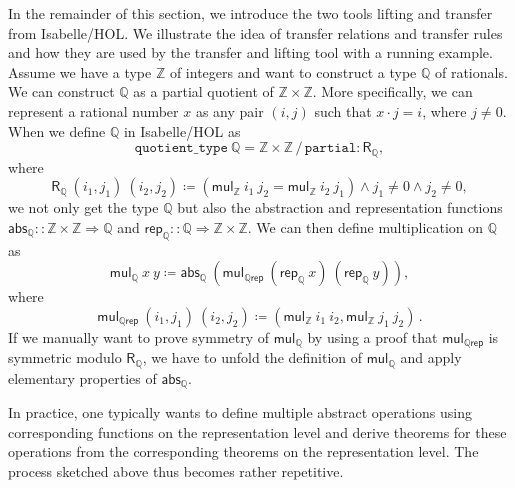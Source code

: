 \documentclass{article}
\theoremstyle{definition}
\newcommand{\inte}{\mathbb{Z}}
\newcommand{\rat}{\mathbb{Q}}
\newcommand{\abs}{\mathsf{abs}}
\newcommand{\rep}{\mathsf{rep}}
\begin{document}
In the remainder of this section,
we introduce the two tools lifting and transfer from Isabelle/HOL.
We illustrate the idea of transfer relations and transfer rules
and how they are used by the transfer and lifting tool with a running example.
Assume we have a type \(\inte\) of integers and want to construct a type \(\rat\) of rationals.
We can construct \(\rat\) as a partial quotient of \(\inte \times \inte\).
More specifically, we can represent a rational number \(x\) as any pair \((i, j)\)
such that \(x \cdot j = i\),
where \(j \neq 0\).
When we define \(\rat\) in Isabelle/HOL as
\begin{equation*}
	\mathtt{quotient\_type}\ \rat = \inte \times \inte\, /\, \mathtt{partial} : \mathsf{R}_{\rat},
\end{equation*}
where
\begin{equation*}
	\mathsf{R}_\rat\ (i_1, j_1)\ (i_2, j_2) \coloneqq (\mathsf{mul_\inte}\ i_1\ j_2 = \mathsf{mul_\inte}\ i_2\ j_1) \land j_1 \neq 0 \land j_2 \neq 0,
\end{equation*}
we not only get the type \(\rat\)
but also the abstraction and representation functions
\(\abs_\rat :: \inte \times \inte \Rightarrow \rat\) and \(\rep_\rat :: \rat \Rightarrow \inte \times \inte\).
We can then define multiplication on $\mathbb{Q}$ as
\begin{equation}\label{eq:mul_rat}
	\mathsf{mul_\rat}\ x\ y \coloneqq \abs_\rat\ (\mathsf{mul_{\rat rep}}\ (\rep_\rat\ x)\ (\rep_\rat\ y)),
\end{equation}
where
\begin{equation*}
	\mathsf{mul_{\rat rep}}\ (i_1, j_1)\ (i_2, j_2) \coloneqq (\mathsf{mul_\inte}\ i_1\ i_2, \mathsf{mul_\inte}\ j_1\ j_2)\,.
\end{equation*}
If we manually want to prove symmetry of \(\mathsf{mul_\rat}\) by using
a proof that \(\mathsf{mul_{\rat rep}}\) is symmetric modulo \(\mathsf{R_\rat}\),
we have to unfold the definition of \(\mathsf{mul_\rat}\)
and apply elementary properties of \(\abs_\rat\).

In practice, one typically wants to define multiple abstract operations
using corresponding functions on the representation level and
derive theorems for these operations from the corresponding theorems on the representation level.
The process sketched above thus becomes rather repetitive.
\end{document}
